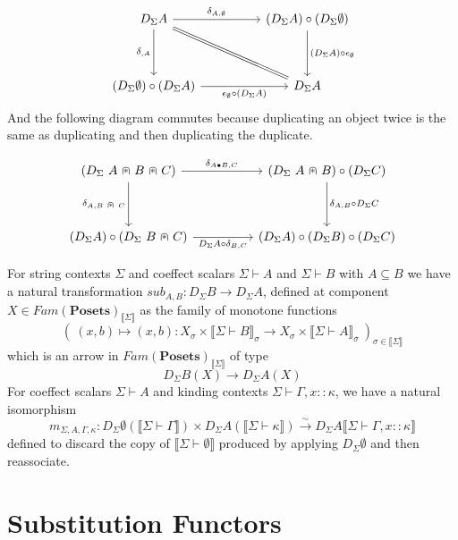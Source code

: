 \documentclass{article}
\newcommand{\mbf}{\mathbf}
\newcommand{\sem}[1]{\llbracket #1 \rrbracket}
\newcommand{\capdot}{~\stackinset{c}{}{c}{}{\scalebox{0.8}{$\ast$}}{$\cap$}~}
\begin{document}
\[\begin{tikzcd}
	{D_{\Sigma} A} && {(D_{\Sigma} A) \circ (D_{\Sigma} \emptyset)} \\
	\\
	{(D_{\Sigma} \emptyset) \circ (D_{\Sigma} A)} && {D_{\Sigma} A}
	\arrow["{\delta_{\empty,A}}"', from=1-1, to=3-1]
	\arrow["{\epsilon_{\emptyset} \circ (D_{\Sigma} A)}"', from=3-1, to=3-3]
	\arrow["{\delta_{A, \emptyset}}", from=1-1, to=1-3]
	\arrow["{(D_{\Sigma} A) \circ \epsilon_{\emptyset}}", from=1-3, to=3-3]
	\arrow[no head, equals, from=1-1, to=3-3]
\end{tikzcd}\]
And the following diagram commutes because duplicating an object twice is the same as duplicating and then duplicating the duplicate.

\[\begin{tikzcd}
	{(D_{\Sigma}~A \capdot B \capdot C)} && {(D_{\Sigma}~A \capdot B) \circ (D_{\Sigma} C)} \\
	\\
	{(D_{\Sigma} A) \circ (D_{\Sigma}~B \capdot C)} && {(D_{\Sigma} A) \circ (D_{\Sigma} B) \circ (D_{\Sigma} C)}
	\arrow["{\delta_{A, B \capdot C}}"', from=1-1, to=3-1]
	\arrow["{D_{\Sigma} A \circ \delta_{B,C}}"', from=3-1, to=3-3]
	\arrow["{\delta_{A \bullet B, C}}", from=1-1, to=1-3]
	\arrow["{\delta_{A,B} \circ D_{\Sigma} C}", from=1-3, to=3-3]
\end{tikzcd}\]

For string contexts $\Sigma$ and coeffect scalars $\Sigma \vdash A$ and $\Sigma \vdash B$ with $A \subseteq B$ we have a natural transformation $\mathit{sub}_{A,B} : D_{\Sigma} B \to D_{\Sigma } A$, defined at component $X \in \mathit{Fam}(\mbf{Posets})_{\sem{\Sigma}}$ as the family of monotone functions $$(~(x,b) \mapsto (x,b) : X_\sigma \times \sem{\Sigma \vdash B}_\sigma \to X_{\sigma} \times \sem{\Sigma \vdash A}_{\sigma}~)_{\sigma \in \sem{\Sigma}}$$
which is an arrow in $\mathit{Fam}(\mbf{Posets})_{\sem{\Sigma}}$ of type $$D_{\Sigma}B(X) \to D_{\Sigma}A(X)$$
For coeffect scalars $\Sigma \vdash A$ and kinding contexts $\Sigma \vdash \Gamma,x :: \kappa$, we have a natural isomorphism $$m_{\Sigma,A,\Gamma,\kappa} : D_{\Sigma} \emptyset(\sem{\Sigma \vdash \Gamma}) \times D_{\Sigma} A( \sem{\Sigma \vdash \kappa} ) \overset{\sim}{\to} D_{\Sigma} A \sem{\Sigma \vdash \Gamma,x :: \kappa}$$ defined to discard the copy of $\sem{\Sigma \vdash \emptyset}$ produced by applying $D_{\Sigma} \emptyset$ and then reassociate.

\section*{Substitution Functors}
\end{document}
